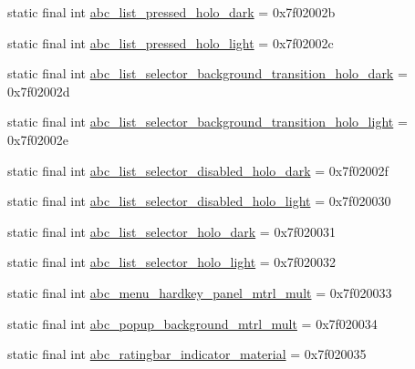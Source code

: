 \begin{CompactItemize}
\item 
static final int \hyperlink{classandroid_1_1support_1_1graphics_1_1drawable_1_1_r_1_1drawable_9c687fd8c967cec23fd98cf8823eea5f}{abc\_\-list\_\-pressed\_\-holo\_\-dark} = 0x7f02002b
\item 
static final int \hyperlink{classandroid_1_1support_1_1graphics_1_1drawable_1_1_r_1_1drawable_22412de525a04a867ab84819c01ea7c7}{abc\_\-list\_\-pressed\_\-holo\_\-light} = 0x7f02002c
\item 
static final int \hyperlink{classandroid_1_1support_1_1graphics_1_1drawable_1_1_r_1_1drawable_4eaf22b83c3e0ea15eb08d85e720dc92}{abc\_\-list\_\-selector\_\-background\_\-transition\_\-holo\_\-dark} = 0x7f02002d
\item 
static final int \hyperlink{classandroid_1_1support_1_1graphics_1_1drawable_1_1_r_1_1drawable_166bdb9d2ce41e476c94f3d93c885f1c}{abc\_\-list\_\-selector\_\-background\_\-transition\_\-holo\_\-light} = 0x7f02002e
\item 
static final int \hyperlink{classandroid_1_1support_1_1graphics_1_1drawable_1_1_r_1_1drawable_fd325212537ac25e5607cf4cbb052f19}{abc\_\-list\_\-selector\_\-disabled\_\-holo\_\-dark} = 0x7f02002f
\item 
static final int \hyperlink{classandroid_1_1support_1_1graphics_1_1drawable_1_1_r_1_1drawable_0951bba722588886e07b11acf4ef54e4}{abc\_\-list\_\-selector\_\-disabled\_\-holo\_\-light} = 0x7f020030
\item 
static final int \hyperlink{classandroid_1_1support_1_1graphics_1_1drawable_1_1_r_1_1drawable_813435cbf635ffa4cf34871f73328fc3}{abc\_\-list\_\-selector\_\-holo\_\-dark} = 0x7f020031
\item 
static final int \hyperlink{classandroid_1_1support_1_1graphics_1_1drawable_1_1_r_1_1drawable_0965f2dc508fde15f59d081bf805dab8}{abc\_\-list\_\-selector\_\-holo\_\-light} = 0x7f020032
\item 
static final int \hyperlink{classandroid_1_1support_1_1graphics_1_1drawable_1_1_r_1_1drawable_ab82cbf27630da2ce3a9ada9c3b9d447}{abc\_\-menu\_\-hardkey\_\-panel\_\-mtrl\_\-mult} = 0x7f020033
\item 
static final int \hyperlink{classandroid_1_1support_1_1graphics_1_1drawable_1_1_r_1_1drawable_0cb10f396994ed0676bdcd74c87e9803}{abc\_\-popup\_\-background\_\-mtrl\_\-mult} = 0x7f020034
\item 
static final int \hyperlink{classandroid_1_1support_1_1graphics_1_1drawable_1_1_r_1_1drawable_639adfc47d089a365f502a6d38857387}{abc\_\-ratingbar\_\-indicator\_\-material} = 0x7f020035

\end{CompactItemize}
